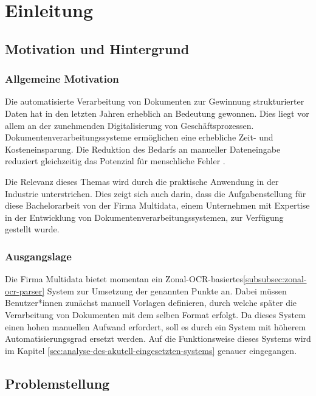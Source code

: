 \chapter{Einleitung}
\label{cha:einleitung}

\section{Motivation und Hintergrund}
\label{sec:motivation-und-hintergrund}

\subsection{Allgemeine Motivation}
\label{subsec:allgemeine-motivation}

Die automatisierte Verarbeitung von Dokumenten zur Gewinnung strukturierter Daten hat in den letzten Jahren erheblich an Bedeutung gewonnen. Dies liegt vor allem an der zunehmenden Digitalisierung von Geschäftsprozessen. Dokumentenverarbeitungssysteme ermöglichen eine erhebliche Zeit- und Kosteneinsparung. Die Reduktion des Bedarfs an manueller Dateneingabe reduziert gleichzeitig das Potenzial für menschliche Fehler \cite{PerotVincent2024LLMD}. %

Die Relevanz dieses Themas wird durch die praktische Anwendung in der Industrie unterstrichen. Dies zeigt sich auch darin, dass die Aufgabenstellung für diese Bachelorarbeit von der Firma Multidata, einem Unternehmen mit Expertise in der Entwicklung von Dokumentenverarbeitungssystemen, zur Verfügung gestellt wurde.

\subsection{Ausgangslage}
\label{subsec:ausgangslage}

Die Firma Multidata bietet momentan ein Zonal-\gls{OCR}-basiertes\ref{subsubsec:zonal-ocr-parser} System zur Umsetzung der genannten Punkte an. Dabei müssen Benutzer*innen zunächst manuell Vorlagen definieren, durch welche später die Verarbeitung von Dokumenten mit dem selben Format erfolgt. Da dieses System einen hohen manuellen Aufwand erfordert, soll es durch ein System mit höherem Automatisierungsgrad ersetzt werden. Auf die Funktionsweise dieses Systems wird im Kapitel \ref{sec:analyse-des-akutell-eingesetzten-systems} genauer eingegangen.

\section{Problemstellung}
\label{sec:problemstellung}

